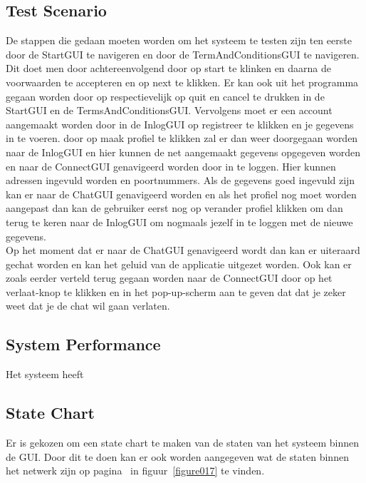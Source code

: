 \documentclass[12pt]{article}
\begin{document}
\subsection{Test Scenario}
De stappen die gedaan moeten worden om het systeem te testen zijn ten eerste door de StartGUI te navigeren en door de TermAndConditionsGUI te navigeren. Dit doet men door achtereenvolgend door op start te klinken en daarna de voorwaarden te accepteren en op next te klikken. Er kan ook uit het programma gegaan worden door op respectievelijk op quit en cancel te drukken in de StartGUI en de TermsAndConditionsGUI. Vervolgens moet er een account aangemaakt worden door in de InlogGUI op registreer te klikken en je gegevens in te voeren. door op maak profiel te klikken zal er dan weer doorgegaan worden naar de InlogGUI en hier kunnen de net aangemaakt gegevens opgegeven worden en naar de ConnectGUI genavigeerd worden door in te loggen. Hier kunnen adressen ingevuld worden en poortnummers. Als de gegevens goed ingevuld zijn kan er naar de ChatGUI genavigeerd worden en als het profiel nog moet worden aangepast dan kan de gebruiker eerst nog op verander profiel klikken om dan terug te keren naar de InlogGUI om nogmaals jezelf in te loggen met de nieuwe gegevens. \\

\noindent Op het moment dat er naar de ChatGUI genavigeerd wordt dan kan er uiteraard gechat worden en kan het geluid van de applicatie uitgezet worden. Ook kan er zoals eerder verteld terug gegaan worden naar de ConnectGUI door op het verlaat-knop te klikken en in het pop-up-scherm aan te geven dat dat je zeker weet dat je de chat wil gaan verlaten.

\subsection{System Performance}
Het systeem heeft 

\subsection{State Chart}
Er is gekozen om een state chart te maken van de staten van het systeem binnen de GUI. Door dit te doen kan er ook worden aangegeven wat de staten binnen het netwerk zijn op pagina~\pageref{figure017} in figuur~\ref{figure017} te vinden.
\end{document}
